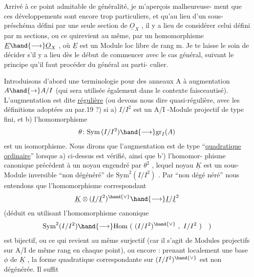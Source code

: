 \placedmargin{\unsure{$\diagdown$}}

Arrivé à ce point admitable de généralité, je m'aperçois malheureuse-%
ment que ces développements sont encore trop particuliers, et qu'au lieu
d'un sous-préschéma défini par une seule section de $\underline{O}_X$ , il y a lieu de
considérer celui défini par m sections, ou ce qui\hand{/}revient au même, par un
homomorphisme $\underline{E} \hand{\longrightarrow} \underline{O}_X$ , où $\underline{E}$ est un Module loc libre de rang m. Je te
laisse le soin de décider s'il y a lieu dès le début de commencer avec le
cas général, suivant le principe qu'il faut procéder du général au parti-%
culier.

Introduisons d'abord une terminologie pour des anneaux A à
augmentation $A \hand{\to} A/I$ (qui sera utilisée également dans le contexte
faisceautisé). L'augmentation est dite \uline{régulière} (ou devons nous dire
quasi-régulière, avec les définitions adoptées au par.19 ?) si a) $I/I^2$ est
un A/I -Module projectif de type fini, et b) l'homomorphisme
\[ \theta\colon \mathrm{Sym}\,(I/I^2) \hand{\longrightarrow} \mathrm{gr}_I(A) \]
est un isomorphisme. Nous dirons que l'augmentation est de type ``\uline{quadratique}
\uline{ordinaire}'' lorsque a) ci-dessus est vérifié, ainsi que b') l'homomor-%
phisme canonique précédent à un noyau engendré par $\theta^2$ , lequel noyau $\underline{K}$
est un sous-Module inversible ``non dégénéré'' de $\mathrm{Sym}^2(I/I^2)$ . Par ``non dégé%
néré'' nous entendons que l'homomorphisme correspondant
\[ \underline{K} \otimes (\underline{I}/\underline{I}^2)^{\hand{\vee}} \hand{\longrightarrow} \underline{I}/\underline{I}^2 \]\placedmargin{\unsure{$\prime$}}
(déduit en utilisant l'homomorphisme canonique
\[ \mathrm{Sym}^2(I/I^2) \hand{\longrightarrow} \mathrm{Hom}\ (\ (I/I^2)^{\hand{\vee}}\ ,\ I/I^2\ )\quad ) \]
est bijectif, ou ce qui revient au même surjectif (car il s'agit de
Modules projectifs sur A/I de même rang en chaque point), ou encore : prenant
localement une base $\phi$ de $\underline{K}$ ,  la forme
quadratique correspondante sur $(I/I^2)^{\hand{\vee}}$ est non dégénérée. Il suffit

